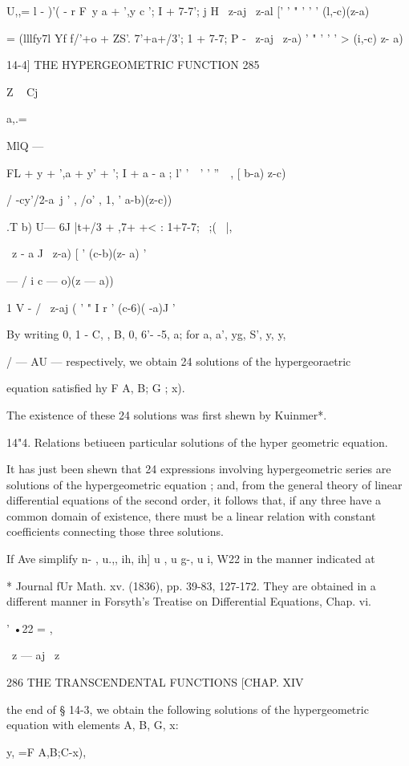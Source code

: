 U,,= l - )'( - r F\ y a + ',y c '; I + 7-7'; j H \ z-aj \ z-al [' ' "
' ' ' (l,-c)(z-a)\

   = (lllfy7l Yf f/'+o + ZS'. 7'+a+/3'; 1 + 7-7; P - \ z-aj \ z-a) ' "
' ' ' > (i,-c) z- a)

14-4] THE HYPERGEOMETRIC FUNCTION 285

Z ~ Cj

a,.=

MlQ —

FL + y + ',a + y' + '; I + a - a ; l' '\ \ ' ' ''\ \ , [ b-a) z-c)

/ -cy'/2-a\ j ' , /o' , 1, ' a-b)(z-c))

.T b) U— 6J |t+/3 + ,7+ +< : 1+7-7; \ ;( \ |,

\ z - a J \ z-a) [ ' (c-b)(z- a) '

— / i c — o)(z — a))

1 V - / \ z-aj ( ' " I r ' (c-6)( -a)J '

By writing 0, 1 - C, , B, 0, 6'- -5, a; for a, a', yg, S', y, y,

/ — AU — respectively, we obtain 24 solutions of the hypergeoraetric

equation satisfied hy F A, B; G ; x).

The existence of these 24 solutions was first shewn by Kuinmer*.

14"4. Relations betiueen particular solutions of the hyper geometric
equation.

It has just been shewn that 24 expressions involving hypergeometric
series are solutions of the hypergeometric equation ; and, from the
general theory of linear differential equations of the second order,
it follows that, if any three have a common domain of existence, there
must be a linear relation with constant coefficients connecting those
three solutions.

If Ave simplify n- , u.,, ih, ih] u , u g-, u i, W22 in the manner
indicated at

* Journal fUr Math. xv. (1836), pp. 39-83, 127-172. They are obtained
in a different manner in Forsyth's Treatise on Differential Equations,
Chap. vi.

' •22 = ,

\ z — aj \ z

286 THE TRANSCENDENTAL FUNCTIONS [CHAP. XIV

the end of § 14-3, we obtain the following solutions of the
hypergeometric equation with elements A, B, G, x:

y, =F A,B;C-x),


